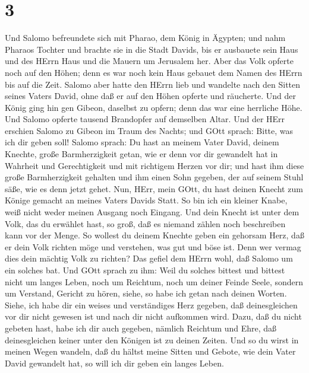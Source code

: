 \hypertarget{section-2}{%
\section{3}\label{section-2}}

 Und Salomo befreundete sich mit Pharao, dem König in
Ägypten; und nahm Pharaos Tochter und brachte sie in die Stadt Davids,
bis er ausbauete sein Haus und des HErrn Haus und die Mauern um
Jerusalem her.  Aber das Volk opferte noch auf den Höhen;
denn es war noch kein Haus gebauet dem Namen des HErrn bis auf die Zeit.
 Salomo aber hatte den HErrn lieb und wandelte nach den
Sitten seines Vaters David, ohne daß er auf den Höhen opferte und
räucherte.  Und der König ging hin gen Gibeon, daselbst zu
opfern; denn das war eine herrliche Höhe. Und Salomo opferte tausend
Brandopfer auf demselben Altar.  Und der HErr erschien
Salomo zu Gibeon im Traum des Nachts; und GOtt sprach: Bitte, was ich
dir geben soll!  Salomo sprach: Du hast an meinem Vater
David, deinem Knechte, große Barmherzigkeit getan, wie er denn vor dir
gewandelt hat in Wahrheit und Gerechtigkeit und mit richtigem Herzen vor
dir; und hast ihm diese große Barmherzigkeit gehalten und ihm einen Sohn
gegeben, der auf seinem Stuhl säße, wie es denn jetzt gehet.
 Nun, HErr, mein GOtt, du hast deinen Knecht zum Könige
gemacht an meines Vaters Davids Statt. So bin ich ein kleiner Knabe,
weiß nicht weder meinen Ausgang noch Eingang.  Und dein
Knecht ist unter dem Volk, das du erwählet hast, so groß, daß es niemand
zählen noch beschreiben kann vor der Menge.  So wollest du
deinem Knechte geben ein gehorsam Herz, daß er dein Volk richten möge
und verstehen, was gut und böse ist. Denn wer vermag dies dein mächtig
Volk zu richten?  Das gefiel dem HErrn wohl, daß Salomo um
ein solches bat.  Und GOtt sprach zu ihm: Weil du solches
bittest und bittest nicht um langes Leben, noch um Reichtum, noch um
deiner Feinde Seele, sondern um Verstand, Gericht zu hören,
 siehe, so habe ich getan nach deinen Worten. Siehe, ich
habe dir ein weises und verständiges Herz gegeben, daß deinesgleichen
vor dir nicht gewesen ist und nach dir nicht aufkommen wird.
 Dazu, daß du nicht gebeten hast, habe ich dir auch
gegeben, nämlich Reichtum und Ehre, daß deinesgleichen keiner unter den
Königen ist zu deinen Zeiten.  Und so du wirst in meinen
Wegen wandeln, daß du hältst meine Sitten und Gebote, wie dein Vater
David gewandelt hat, so will ich dir geben ein langes Leben.
